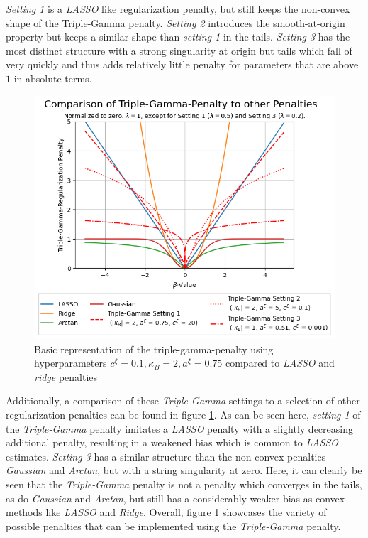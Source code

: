 \documentclass[12pt,a4paper]{article}
\begin{document}
\textit{Setting 1} is a \textit{LASSO} like regularization penalty, but still keeps the non-convex shape of the Triple-Gamma penalty. \textit{Setting 2} introduces the smooth-at-origin property but keeps a similar shape than \textit{setting 1} in the tails. \textit{Setting 3} has the most distinct structure with a strong singularity at origin but tails which fall of very quickly and thus adds relatively little penalty for parameters that are above $1$ in absolute terms.\\

\begin{figure}[h!]
\centering
\includegraphics[scale=0.75]{../02_simulation/021_simulation_figures/TGPenalty_Comparison.png}
\caption{Basic representation of the triple-gamma-penalty using hyperparameters $c^\xi = 0.1, \kappa_B = 2, a^\xi = 0.75$ compared to \textit{LASSO} and \textit{ridge} penalties}
\label{fig:DifferentPenalties}
\end{figure}

Additionally, a comparison of these \textit{Triple-Gamma} settings to a selection of other regularization penalties can be found in figure \ref{fig:DifferentPenalties}. As can be seen here, \textit{setting 1} of the \textit{Triple-Gamma} penalty imitates a \textit{LASSO} penalty with a slightly decreasing additional penalty, resulting in a weakened bias which is common to \textit{LASSO} estimates. \textit{Setting 3} has a similar structure than the non-convex penalties \textit{Gaussian} and \textit{Arctan}, but with a string singularity at zero. Here, it can clearly be seen that the \textit{Triple-Gamma} penalty is not a penalty which converges in the tails, as do \textit{Gaussian} and \textit{Arctan}, but still has a considerably weaker bias as convex methods like \textit{LASSO} and \textit{Ridge}. Overall, figure \ref{fig:DifferentPenalties} showcases the variety of possible penalties that can be implemented using the \textit{Triple-Gamma} penalty. 
\end{document}
